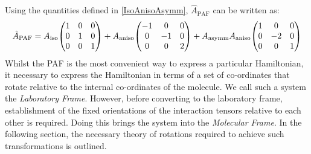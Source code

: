 Using the quantities defined in \ref{IsoAnisoAsymm}, $\hat{A}_{\text{PAF}}$ can be written as:
\begin{equation}
\label{PAFtensor_broken}
\hat{A}_{\text{PAF}} = A_{\text{iso}} \mqty(\imat{3}) + A_{\text{aniso}} \mqty(-1 & 0 & 0 \\ 0 & -1 & 0 \\ 0 & 0 & 2) + A_{\text{asymm}} A_{\text{aniso}} \mqty(1 & 0 & 0 \\ 0 & -2 & 0 \\ 0 & 0 & 1)
\end{equation}  
Whilst the PAF is the most convenient way to express a particular Hamiltonian, it necessary to express the Hamiltonian in terms of a set of co-ordinates that rotate relative to the internal co-ordinates of the molecule. We call such a system the \textit{Laboratory Frame}. However, before converting to the laboratory frame, establishment of the fixed orientations of the interaction tensors relative to each other is required. Doing this brings the system into the \textit{Molecular Frame}. In the following section, the necessary theory of rotations required to achieve such transformations is outlined. 
